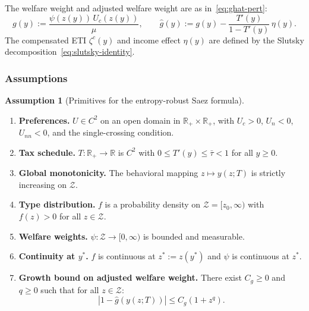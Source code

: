 \documentclass[12pt,a4paper]{article}
\theoremstyle{definition}
\newtheorem{assumption}{Assumption}[section]
\theoremstyle{plain}
\theoremstyle{remark}
\newcommand{\R}{\mathbb{R}}
\newcommand{\zlow}{z_{\scriptscriptstyle 0}}
\newcommand{\calZ}{\mathcal{Z}}
\begin{document}
The welfare weight and adjusted welfare weight are as
in~\eqref{eq:ghat-pert}:
\[
  g(y) := \frac{\psi(z(y))\,U_c(z(y))}{\mu}, \qquad
  \hat g(y) := g(y) - \frac{T'(y)}{1-T'(y)}\,\eta(y).
\]
The compensated ETI $\zeta^c(y)$ and income effect
$\eta(y)$ are defined by the Slutsky
decomposition~\eqref{eq:slutsky-identity}.


\subsubsection{Assumptions}

\begin{assumption}[Primitives for the entropy-robust Saez formula]
\label{as:clean_main}
\leavevmode
\begin{enumerate}[leftmargin=2.8em]

\item[\textup{(U)}] \textbf{Preferences.}
$U \in C^2$ on an open domain in $\R_+ \times \R_+$, with $U_c > 0$, $U_n < 0$, $U_{nn} < 0$, and the single-crossing condition.

\item[\textup{(T)}] \textbf{Tax schedule.}
$T : \R_+ \to \R$ is $C^2$ with $0 \le T'(y) \le \bar\tau < 1$ for all $y \ge 0$.

\item[\textup{(M)}] \textbf{Global monotonicity.}
The behavioral mapping $z \mapsto y(z;T)$ is strictly increasing on $\calZ$.

\item[\textup{(F)}] \textbf{Type distribution.}
$f$ is a probability density on $\calZ = [\zlow,\infty)$ with $f(z) > 0$ for all $z \in \calZ$.

\item[\textup{($\psi$)}] \textbf{Welfare weights.}
$\psi : \calZ \to [0,\infty)$ is bounded and measurable.

\item[\textup{(C)}] \textbf{Continuity at $y^*$.}
$f$ is continuous at $z^* := z(y^*)$ and $\psi$ is continuous at $z^*$.

\item[\textup{(G)}] \textbf{Growth bound on adjusted welfare weight.}
There exist $C_g \ge 0$ and $q \ge 0$ such that for all $z \in \calZ$:
\begin{equation}
\label{eq:clean_ghat_bound}
  |1 - \hat g(y(z;T))| \le C_g(1+z^q).
\end{equation}


\end{enumerate}
\end{assumption}
\end{document}
